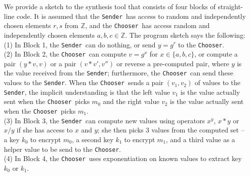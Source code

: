 \documentclass[preprint]{sig-alternate-05-2015}
\def\sender{{\tt{Sender}}}
\def\chooser{{\tt{Chooser}}}
\begin{document}

We provide a sketch to the synthesis tool that consists of four blocks of straight-line code.
It is assumed that the \sender\ has access to random and independently chosen elements 
$r,s$ from $\mathbb{Z}$, and the \chooser\ has access random and independently chosen
elements $a,b,c\in\mathbb{Z}$.  The program sketch says the following:
\\
(1) In Block 1, the \sender\ can do nothing, or send $y=g^r$ to the \chooser.
\\
(2) In Block 2, the \chooser\ can compute $v=g^x$ for $x\in\{a,b,c\}$, or compute
a pair $(y*v,v)$ or a pair $(v*v',v'')$ or reverse a pre-computed pair, 
where $y$ is the value received from the \sender; furthermore,
the \chooser\ can send these values to the \sender.
When the \chooser\ sends a pair $(v_1,v_2)$ of values to the \sender, 
the implicit understanding is that
the left value $v_1$ is the value actually sent when the \chooser\ picks $m_0$ and 
the right value $v_2$ is the value actually sent when the \chooser\ picks $m_1$.
\\
(3) In Block 3, the \sender\ can compute new values using operators
$x^y$, $x*y$ or $x/y$ if she has access to $x$ and $y$;
she then picks 3 values from the 
computed set -- a key $k_0$ to
encrypt $m_0$, a second key $k_1$ to encrypt $m_1$, and a third value as a helper value
to be send to the \chooser.
\\
(4) In Block 4, the \chooser\ uses exponentiation on known values to extract key $k_0$ or $k_1$.
\end{document}
